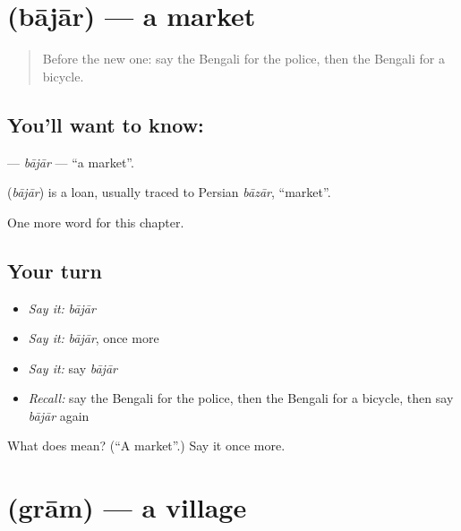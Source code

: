 \section[\texorpdfstring{\bn{বাজার} (bājār)}{বাজার (bājār)}]{ (bājār) — a market}

\label{lesson:BN-C84-bajar}



\begin{quote}
Before the new one: say the Bengali for the police, then the Bengali for a bicycle.
\end{quote}

\subsection*{You'll want to know: }
\textbf{} — \emph{bājār} — \textquotedblleft{}a market\textquotedblright{}.

\begin{cousinweb}
\textbf{} (\emph{bājār}) is a loan, usually traced to Persian \emph{bāzār}, \textquotedblleft{}market\textquotedblright{}.
\end{cousinweb}

\begin{grammarlens}[title={What you've built}]
One more word for this chapter.
\end{grammarlens}

\subsection*{Your turn}
\begin{itemize}
\raggedright
  \item \emph{Say it:} \emph{bājār}
  \item \emph{Say it:} \emph{bājār}, once more
  \item \emph{Say it:} say \emph{bājār}
  \item \emph{Recall:} say the Bengali for the police, then the Bengali for a bicycle, then say \emph{bājār} again
\end{itemize}

\begin{tcolorbox}[breakable,colback=teal!4,colframe=teal!35!black,title={Before you move on}]
What does  mean? (\textquotedblleft{}A market\textquotedblright{}.) Say it once more.
\end{tcolorbox}
\section[\texorpdfstring{\bn{গ্রাম} (grām)}{গ্রাম (grām)}]{ (grām) — a village}

